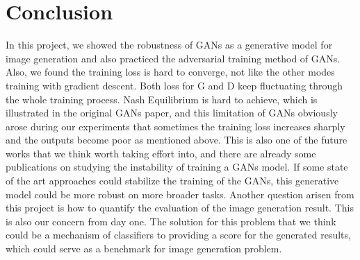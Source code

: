 \documentclass[10pt,twocolumn,letterpaper]{article}
\begin{document}
\section{Conclusion}
In this project, we showed the robustness of GANs as a generative model for image generation and also practiced the adversarial training method of GANs. Also, we found the training loss is hard to converge, not like the other modes training with gradient descent. Both loss for G and D keep fluctuating through the whole training process. Nash Equilibrium is hard to achieve, which is illustrated in the original GANs paper, and this limitation of GANs obviously arose during our experiments that sometimes the training loss increases sharply and the outputs become poor as mentioned above. This is also one of the future works that we think worth taking effort into, and there are already some publications on studying the instability of training a GANs model\cite{arjovsky2017towards}\cite{arjovsky2017wasserstein}. If some state of the art approaches could stabilize the training of the GANs, this generative model could be more robust on more broader tasks. Another question arisen from this project is how to quantify the evaluation of the image generation result. This is also our concern from day one. The solution for this problem that we think could be a mechanism of classifiers to providing a score for the generated results, which could serve as a benchmark for image generation problem.


{\small


}
\end{document}
